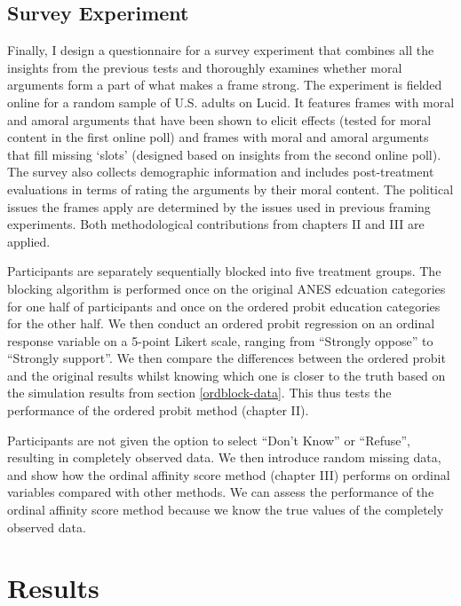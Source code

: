 \documentclass[12pt,econ]{sources/authesis}
\begin{document}
\hypertarget{framing-data-survey}{%
\subsection{Survey Experiment}\label{framing-data-survey}}

Finally, I design a questionnaire for a survey experiment that combines all the insights from the previous tests and thoroughly examines whether moral arguments form a part of what makes a frame strong. The experiment is fielded online for a random sample of U.S. adults on Lucid. It features frames with moral and amoral arguments that have been shown to elicit effects (tested for moral content in the first online poll) and frames with moral and amoral arguments that fill missing `slots' (designed based on insights from the second online poll). The survey also collects demographic information and includes post-treatment evaluations in terms of rating the arguments by their moral content. The political issues the frames apply are determined by the issues used in previous framing experiments. Both methodological contributions from chapters II and III are applied.

Participants are separately sequentially blocked into five treatment groups. The blocking algorithm is performed once on the original ANES edcuation categories for one half of participants and once on the ordered probit education categories for the other half. We then conduct an ordered probit regression on an ordinal response variable on a 5-point Likert scale, ranging from ``Strongly oppose'' to ``Strongly support''. We then compare the differences between the ordered probit and the original results whilst knowing which one is closer to the truth based on the simulation results from section \ref{ordblock-data}. This thus tests the performance of the ordered probit method (chapter II).

Participants are not given the option to select ``Don't Know'' or ``Refuse'', resulting in completely observed data. We then introduce random missing data, and show how the ordinal affinity score method (chapter III) performs on ordinal variables compared with other methods. We can assess the performance of the ordinal affinity score method because we know the true values of the completely observed data.

\hypertarget{framing-results}{%
\section{Results}\label{framing-results}}
\end{document}
